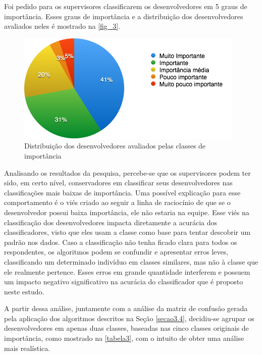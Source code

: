 Foi pedido para os supervisores classificarem os desenvolvedores em 5 graus de importância. Esses graus de importância e a distribuição dos desenvolvedores avaliados neles é mostrado na \autoref{fig_3}.

\begin{figure}[h]
	\centering
	\includegraphics[scale=0.8]{figs/geral/imagem-classe-original.png}
	\caption{\label{fig_3}Distribuição dos desenvolvedores avaliados pelas classes de importância}
\end{figure}

Analisando os resultados da pesquisa, percebe-se que os supervisores podem ter sido, em certo nível, conservadores em classificar seus desenvolvedores nas classificações mais baixas de importância. Uma possível explicação para esse comportamento é o viés criado ao seguir a linha de raciocínio de que se o desenvolvedor possui baixa importância, ele não estaria na equipe.
Esse viés na classificação dos desenvolvedores impacta diretamente a acurácia dos classificadores, visto que eles usam a classe como base para tentar descobrir um padrão nos dados. Caso a classificação não tenha ficado clara para todos os respondentes, os algoritmos podem se confundir e apresentar erros leves, classificando um determinado indivíduo em classes similares, mas não à classe que ele realmente pertence. Esses erros em grande quantidade interferem e possuem um impacto negativo significativo na acurácia do classificador que é proposto neste estudo.

A partir dessa análise, juntamente com a análise da matriz de confusão gerada pela aplicação dos algoritmos descritos na Seção \ref{secao3.4}, decidiu-se agrupar os desenvolvedores em apenas duas classes, baseadas nas cinco classes originais de importância, como mostrado na \autoref{tabela3}, com o intuito de obter uma análise mais realística.


